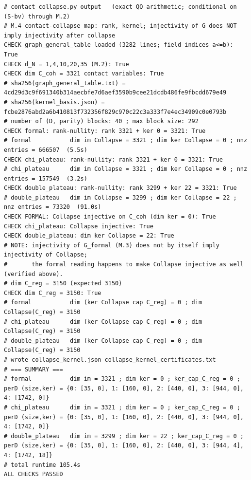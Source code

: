 \documentclass{article}
\theoremstyle{remark}
\begin{document}
\begin{lstlisting}
# contact_collapse.py output   (exact QQ arithmetic; conditional on (S-bv) through M.2)
# M.4 contact-collapse map: rank, kernel; injectivity of G does NOT imply injectivity after collapse
CHECK graph_general_table loaded (3282 lines; field indices a<=b): True
CHECK d_N = 1,4,10,20,35 (M.2): True
CHECK dim C_coh = 3321 contact variables: True
# sha256(graph_general_table.txt) = 4cd29d3c9f691340b314aecbfe7d6aef3590b9cee21dcdb486fe9fbcdd679e49
# sha256(kernel_basis.json) = fcbe2876abd2a6b410813f732356f829c970c22c3a333f7e4ec34909c0e0793b
# number of (D, parity) blocks: 40 ; max block size: 292
CHECK formal: rank-nullity: rank 3321 + ker 0 = 3321: True
# formal           dim im Collapse = 3321 ; dim ker Collapse = 0 ; nnz entries = 666507  (5.5s)
CHECK chi_plateau: rank-nullity: rank 3321 + ker 0 = 3321: True
# chi_plateau      dim im Collapse = 3321 ; dim ker Collapse = 0 ; nnz entries = 157549  (3.2s)
CHECK double_plateau: rank-nullity: rank 3299 + ker 22 = 3321: True
# double_plateau   dim im Collapse = 3299 ; dim ker Collapse = 22 ; nnz entries = 73320  (91.0s)
CHECK FORMAL: Collapse injective on C_coh (dim ker = 0): True
CHECK chi_plateau: Collapse injective: True
CHECK double_plateau: dim ker Collapse = 22: True
# NOTE: injectivity of G_formal (M.3) does not by itself imply injectivity of Collapse;
#       the formal reading happens to make Collapse injective as well (verified above).
# dim C_reg = 3150 (expected 3150)
CHECK dim C_reg = 3150: True
# formal           dim (ker Collapse cap C_reg) = 0 ; dim Collapse(C_reg) = 3150
# chi_plateau      dim (ker Collapse cap C_reg) = 0 ; dim Collapse(C_reg) = 3150
# double_plateau   dim (ker Collapse cap C_reg) = 0 ; dim Collapse(C_reg) = 3150
# wrote collapse_kernel.json collapse_kernel_certificates.txt
# === SUMMARY ===
# formal           dim im = 3321 ; dim ker = 0 ; ker_cap_C_reg = 0 ; perD (size,ker) = {0: [35, 0], 1: [160, 0], 2: [440, 0], 3: [944, 0], 4: [1742, 0]}
# chi_plateau      dim im = 3321 ; dim ker = 0 ; ker_cap_C_reg = 0 ; perD (size,ker) = {0: [35, 0], 1: [160, 0], 2: [440, 0], 3: [944, 0], 4: [1742, 0]}
# double_plateau   dim im = 3299 ; dim ker = 22 ; ker_cap_C_reg = 0 ; perD (size,ker) = {0: [35, 0], 1: [160, 0], 2: [440, 0], 3: [944, 4], 4: [1742, 18]}
# total runtime 105.4s
ALL CHECKS PASSED
\end{lstlisting}
\end{document}
